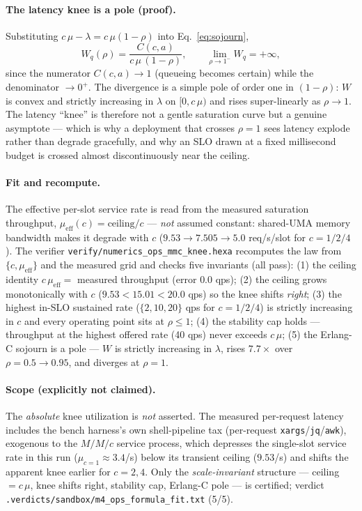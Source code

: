 \documentclass[11pt,a4paper]{article}
\begin{document}
\paragraph{The latency knee is a pole (proof).} Substituting
\(c\,\mu-\lambda=c\,\mu(1-\rho)\) into Eq.~\eqref{eq:sojourn},
\begin{equation}
  W_q(\rho) = \frac{C(c,a)}{c\,\mu\,(1-\rho)},
  \qquad
  \lim_{\rho\to1^-} W_q = +\infty,
  \label{eq:pole}
\end{equation}
since the numerator \(C(c,a)\to1\) (queueing becomes certain) while the
denominator \(\to0^+\). The divergence is a simple pole of order one in
\((1-\rho)\): \(W\) is convex and strictly increasing in \(\lambda\) on
\([0,c\,\mu)\) and rises super-linearly as \(\rho\to1\). The latency ``knee'' is
therefore not a gentle saturation curve but a genuine asymptote --- which is why
a deployment that crosses \(\rho=1\) sees latency explode rather than degrade
gracefully, and why an SLO drawn at a fixed millisecond budget is crossed almost
discontinuously near the ceiling.

\paragraph{Fit and recompute.} The effective per-slot service rate is read from
the measured saturation throughput, \(\mu_{\mathrm{eff}}(c) = \text{ceiling}/c\)
--- \emph{not} assumed constant: shared-UMA memory bandwidth makes it degrade
with \(c\) (\(9.53 \to 7.505 \to 5.0\) req/s/slot for \(c{=}1/2/4\)). The
verifier \texttt{verify/numerics\_ops\_mmc\_knee.hexa} recomputes the law from
\(\{c,\mu_{\mathrm{eff}}\}\) and the measured grid and checks five invariants
(all pass): (1) the ceiling identity \(c\,\mu_{\mathrm{eff}} =\) measured
throughput (error \(0.0\) qps); (2) the ceiling grows monotonically with \(c\)
(\(9.53 < 15.01 < 20.0\) qps) so the knee shifts \emph{right}; (3) the highest
in-SLO sustained rate (\(\{2,10,20\}\) qps for \(c{=}1/2/4\)) is strictly
increasing in \(c\) and every operating point sits at \(\rho \le 1\); (4) the
stability cap holds --- throughput at the highest offered rate (40 qps) never
exceeds \(c\,\mu\); (5) the Erlang-C sojourn is a pole --- \(W\) is strictly
increasing in \(\lambda\), rises \(7.7\times\) over \(\rho{=}0.5\to0.95\), and
diverges at \(\rho{=}1\).

\paragraph{Scope (explicitly not claimed).} The \emph{absolute} knee
utilization is \emph{not} asserted. The measured per-request latency includes
the bench harness's own shell-pipeline tax (per-request \texttt{xargs}/\texttt{jq}/\texttt{awk}),
exogenous to the \(M/M/c\) service process, which depresses the single-slot
service rate in this run (\(\mu_{c=1}\approx 3.4\)/s) below its transient
ceiling (\(9.53\)/s) and shifts the apparent knee earlier for \(c{=}2,4\). Only
the \emph{scale-invariant} structure --- ceiling \(=c\,\mu\), knee shifts right,
stability cap, Erlang-C pole --- is certified; verdict
\texttt{.verdicts/sandbox/m4\_ops\_formula\_fit.txt} (5/5).
\end{document}
